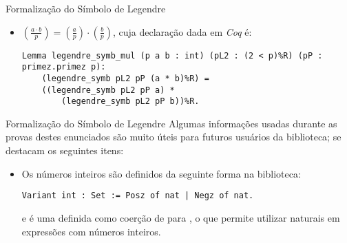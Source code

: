\begin{frame}[fragile]{Formalização do Símbolo de Legendre}

    \begin{itemize}
        \item $\left(\frac{a \cdot b}{p}\right) = \left(\frac{a}{p}\right) \cdot \left(\frac{b}{p}\right)$, cuja declaração dada em \textit{Coq} é:
        \newline
            \begin{lstlisting}[language=coq,frame=single,tabsize=1]
Lemma legendre_symb_mul (p a b : int) (pL2 : (2 < p)%R) (pP : primez.primez p):
    (legendre_symb pL2 pP (a * b)%R) = 
    ((legendre_symb pL2 pP a) * 
        (legendre_symb pL2 pP b))%R.
            \end{lstlisting}
    \end{itemize}

\end{frame}

\begin{frame}[fragile]{Formalização do Símbolo de Legendre}
    Algumas informações usadas durante as provas destes enunciados são muito úteis para futuros usuários da biblioteca; se destacam os seguintes itens:
    \begin{itemize}
        \item Os números inteiros são definidos da seguinte forma na biblioteca:
            \begin{lstlisting}[language=coq,frame=single,tabsize=1]
Variant int : Set := Posz of nat | Negz of nat.
            \end{lstlisting}
        e  é uma definida como coerção de  para , o que permite utilizar naturais em expressões com números inteiros.

        
    \end{itemize}
\end{frame}

